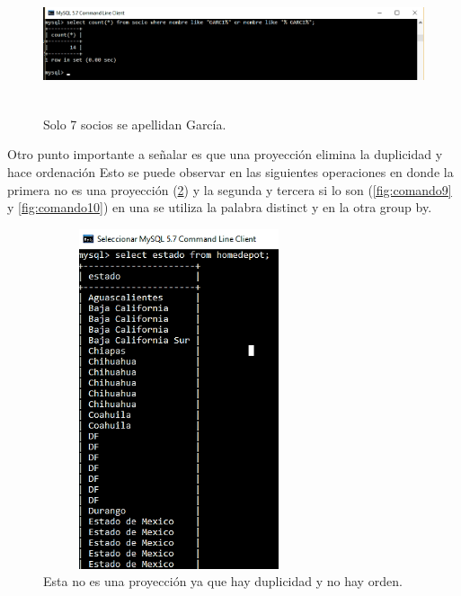 \documentclass[12pt, titlepage]{article}
\begin{document}
 \begin{figure}[H]
	\begin{center}
		\includegraphics[width=15cm, height=4cm]{img/comando7.png}
		\caption{Solo 7 socios se apellidan García.}
		\label{fig:comando7}
	\end{center}
\end{figure}
Otro punto importante a señalar es que una proyección elimina la duplicidad y hace ordenación Esto se puede observar en las siguientes operaciones en donde la primera no es una proyección (\ref{fig:comando8}) y la segunda y tercera si lo son (\ref{fig:comando9} y \ref{fig:comando10}) en una se utiliza la palabra distinct y en la otra group by.
 \begin{figure}[H]
	\begin{center}
		\includegraphics[width=8cm, height=10cm]{img/comando8.png}
		\caption{Esta no es una proyección ya que hay duplicidad y no hay orden.}
		\label{fig:comando8}
	\end{center}
\end{figure}
\end{document}
